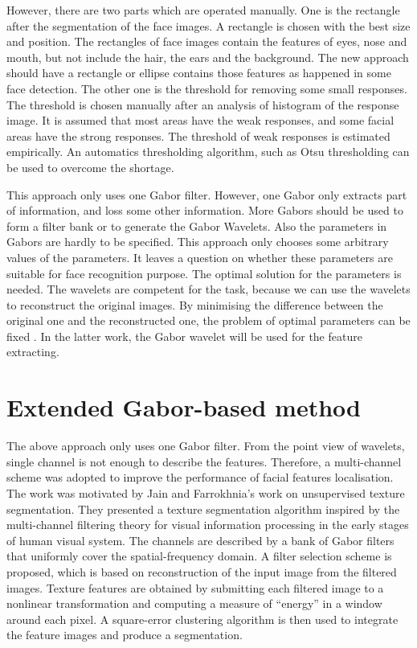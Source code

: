 However, there are two parts which are operated manually. One is the rectangle after the segmentation of the face images. A rectangle is chosen with the best size and position. The rectangles of face images contain the features of eyes, nose and mouth, but not include the hair, the ears and the background.  The new approach should have a rectangle or ellipse contains those features as happened in some face detection. The other one is the threshold for removing some small responses. The threshold is chosen manually after an analysis of histogram of the response image. It is assumed that most areas have the weak responses, and some facial areas have the strong responses. The threshold of weak responses is estimated empirically. An automatics thresholding algorithm, such as Otsu thresholding can be used to overcome the shortage.

This approach only uses one Gabor filter. However, one Gabor only extracts part of information, and loss some other information. More Gabors should be used to form a filter bank or to generate the Gabor Wavelets. Also the parameters in Gabors are hardly to be specified. This approach only chooses some arbitrary values of the parameters. It leaves a question on whether these parameters are suitable for face recognition purpose. The optimal solution for the parameters is needed. The wavelets are competent for the task, because we can use the wavelets to reconstruct the original images. By minimising the difference between the original one and the reconstructed one, the problem of optimal parameters can be fixed \cite{Lee1996}.  In the latter work, the Gabor wavelet will be used for the feature extracting.

\chapter{Extended Gabor-based method}
The above approach only uses one Gabor filter. From the point view of wavelets, single channel is not enough to describe the features. Therefore, a multi-channel scheme was adopted to improve the performance of facial features localisation. The work was motivated by Jain and Farrokhnia’s work \cite{Jain1991} on unsupervised texture segmentation. They presented a texture segmentation algorithm inspired by the multi-channel filtering theory for visual information processing in the early stages of human visual system. The channels are described by a bank of Gabor filters that uniformly cover the spatial-frequency domain. A filter selection scheme is proposed, which is based on reconstruction of the input image from the filtered images. Texture features are obtained by submitting each filtered image to a nonlinear transformation and computing a measure of ``energy'' in a window around each pixel. A square-error clustering algorithm is then used to integrate the feature images and produce a segmentation.
